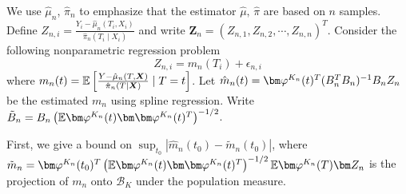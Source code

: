 \iffalse
We use $\hat\mu_n$, $\hat\pi_n$ to emphasize that the estimator $\hat\mu,\,\hat\pi$ are based on $n$ samples.
Define $Z_{n,i}=\frac{Y_i-\hat\mu_n(T_i,X_i)}{\hat \pi_n(T_i\mid X_i)}$ and write $\bm{Z}_n=(Z_{n,1}, Z_{n,2},\cdots,Z_{n,n})^T$. Consider the following nonparametric regression problem 
$$
Z_{n,i}=m_n(T_i)+\epsilon_{n,i}
$$
where $m_n(t)=\mathbb{E} \left[\frac{Y-\hat\mu_n(T,\boldsymbol{X})}{\hat\pi_n(T\mid\boldsymbol{X})}\mid T=t\right]$. 
Let $\hat m_n(t)=\vpk(t)^T(B_n^TB_n)^{-1}B_nZ_n$ be the estimated $m_n$ using spline regression.
Write $\tilde{B}_n=B_n\left(\E \vpk(t)\bm\vpk(t)^T\right)^{-1/2}$. %

First, we give a bound on $\sup_{t_0}|\hat m_n(t_0)-\tilde m_{n}(t_0)|$, where $\tilde m_n=\vpk(t_0)^T\left(\E \vpk(t)\bm\vpk(t)^T\right)^{-1/2}\E\vpk(T)\Zn$ is the projection of $m_n$ onto $\mathcal{B}_{K}$ under the population measure. 

